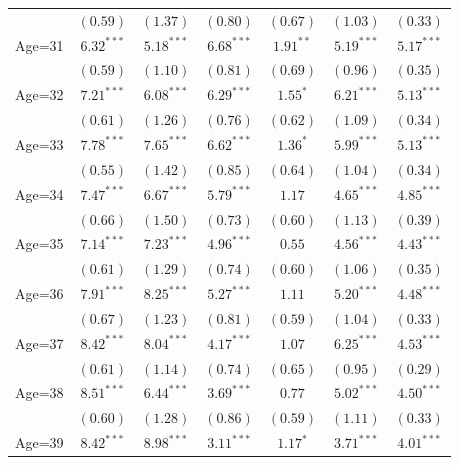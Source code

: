 \documentclass[fullpage]{paper}
\begin{document}
\begin{center}
\begin{longtable}{l c c c c c c }
            & $(0.59)$      & $(1.37)$      & $(0.80)$       & $(0.67)$      & $(1.03)$      & $(0.33)$      \\
Age=31      & $6.32^{***}$  & $5.18^{***}$  & $6.68^{***}$   & $1.91^{**}$   & $5.19^{***}$  & $5.17^{***}$  \\
            & $(0.59)$      & $(1.10)$      & $(0.81)$       & $(0.69)$      & $(0.96)$      & $(0.35)$      \\
Age=32      & $7.21^{***}$  & $6.08^{***}$  & $6.29^{***}$   & $1.55^{*}$    & $6.21^{***}$  & $5.13^{***}$  \\
            & $(0.61)$      & $(1.26)$      & $(0.76)$       & $(0.62)$      & $(1.09)$      & $(0.34)$      \\
Age=33      & $7.78^{***}$  & $7.65^{***}$  & $6.62^{***}$   & $1.36^{*}$    & $5.99^{***}$  & $5.13^{***}$  \\
            & $(0.55)$      & $(1.42)$      & $(0.85)$       & $(0.64)$      & $(1.04)$      & $(0.34)$      \\
Age=34      & $7.47^{***}$  & $6.67^{***}$  & $5.79^{***}$   & $1.17$        & $4.65^{***}$  & $4.85^{***}$  \\
            & $(0.66)$      & $(1.50)$      & $(0.73)$       & $(0.60)$      & $(1.13)$      & $(0.39)$      \\
Age=35      & $7.14^{***}$  & $7.23^{***}$  & $4.96^{***}$   & $0.55$        & $4.56^{***}$  & $4.43^{***}$  \\
            & $(0.61)$      & $(1.29)$      & $(0.74)$       & $(0.60)$      & $(1.06)$      & $(0.35)$      \\
Age=36      & $7.91^{***}$  & $8.25^{***}$  & $5.27^{***}$   & $1.11$        & $5.20^{***}$  & $4.48^{***}$  \\
            & $(0.67)$      & $(1.23)$      & $(0.81)$       & $(0.59)$      & $(1.04)$      & $(0.33)$      \\
Age=37      & $8.42^{***}$  & $8.04^{***}$  & $4.17^{***}$   & $1.07$        & $6.25^{***}$  & $4.53^{***}$  \\
            & $(0.61)$      & $(1.14)$      & $(0.74)$       & $(0.65)$      & $(0.95)$      & $(0.29)$      \\
Age=38      & $8.51^{***}$  & $6.44^{***}$  & $3.69^{***}$   & $0.77$        & $5.02^{***}$  & $4.50^{***}$  \\
            & $(0.60)$      & $(1.28)$      & $(0.86)$       & $(0.59)$      & $(1.11)$      & $(0.33)$      \\
Age=39      & $8.42^{***}$  & $8.98^{***}$  & $3.11^{***}$   & $1.17^{*}$    & $3.71^{***}$  & $4.01^{***}$  \\

\end{longtable}
\end{center}
\end{document}
